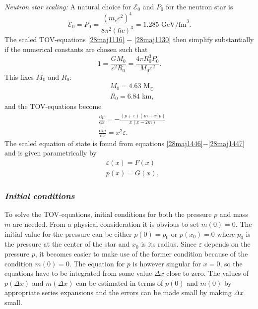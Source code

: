 \documentclass[twocolumn]{article}
\begin{document}
\begin{large}
\textit{Neutron star scaling:}
A natural choice for $\mathcal{E}_0$ and $P_0$ for the neutron star is
\begin{equation}
    \mathcal{E}_0 = P_0 = \frac{(m_ec^2)^4}{8\pi^2(\hbar c)^3} = 1.285 \text{ GeV/fm}^3.
\end{equation}
The scaled TOV-equations \eqref{28maj1116} $-$ \eqref{28maj1130} then simplify substantially if the numerical constants are chosen such that
\begin{equation}
    \label{26maj1005}
    1 = \frac{GM_0}{c^2R_0} = \frac{4\pi R_0^3P_0}{M_0c^2}.
\end{equation}
This fixes $M_0$ and $R_0$:
\begin{equation}
    \begin{split}
    &M_0 = 4.63 \text{ M}_\odot \\ 
    &R_0 = 6.84 \text{ km},
    \end{split}
\end{equation}
and the TOV-equations become
\begin{equation}
    \label{24maj1640}
    \begin{split}
        &\frac{\text{d}p}{\text{d}x} = -\frac{(p+\varepsilon)(m+x^3p)}{x(x-2m)} \\  %
        &\frac{\text{d}m}{\text{d}x} = x^2\varepsilon. %
    \end{split}
\end{equation}
The scaled equation of state is found from equations \eqref{28maj1446}$-$\eqref{28maj1447} and is given parametrically by
\begin{equation}
    \begin{split}
        &\varepsilon(x) = F(x) \\ 
        &p(x) = G(x).
    \end{split}
\end{equation}

\subsubsection*{\textit{Initial conditions}}
To solve the TOV-equations, initial conditions for both the pressure $p$ and mass $m$ are needed. From a physical consideration it is obvious to set $m(0)=0$. The initial value for the pressure can be either $p(0) = p_0$ or $p(x_0) = 0$ where $p_0$ is the pressure at the center of the star and $x_0$ is its radius. Since $\varepsilon$ depends on the pressure $p$, it becomes easier to make use of the former condition because of the condition $m(0)=0$. The equation for $p$ is however singular for $x=0$, so the equations have to be integrated from some value $\Delta x$ close to zero. The values of $p(\Delta x)$ and $m(\Delta x)$ can be estimated in terms of $p(0)$ and $m(0)$ by appropriate series expansions and the errors can be made small by making $\Delta x$ small.


\end{large}
\end{document}
